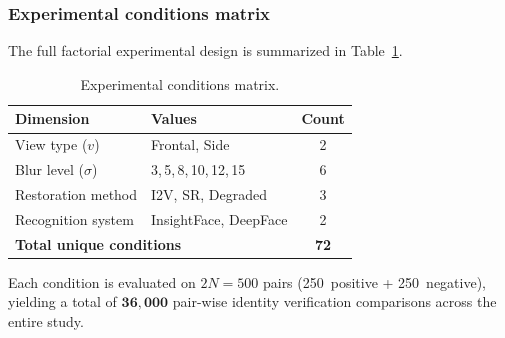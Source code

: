 \subsubsection{Experimental conditions matrix}
\label{subsubsec:conditions}

The full factorial experimental design is summarized in
Table~\ref{tab:conditions}.

\begin{table}[h]
\centering
\caption{Experimental conditions matrix.}
\label{tab:conditions}
\begin{tabular}{l l c}
\toprule
\textbf{Dimension} & \textbf{Values} & \textbf{Count} \\
\midrule
View type ($v$) & Frontal, Side & 2 \\
Blur level ($\sigma$) & 3,\,5,\,8,\,10,\,12,\,15 & 6 \\
Restoration method & I2V, SR, Degraded & 3 \\
Recognition system & InsightFace, DeepFace & 2 \\
\midrule
\multicolumn{2}{l}{\textbf{Total unique conditions}} & \textbf{72} \\
\bottomrule
\end{tabular}
\end{table}

\noindent
Each condition is evaluated on $2N = 500$ pairs (250~positive +
250~negative), yielding a total of $\mathbf{36{,}000}$ pair-wise
identity verification comparisons across the entire study.
